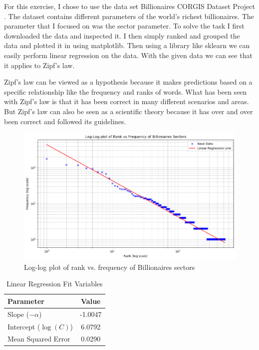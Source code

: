 \documentclass{article}
\begin{document}
For this exercise, I chose to use the data set Billionaires CORGIS Dataset Project \cite{corgiseduCORGISDatasets}. The dataset contains different parameters of the world's richest billionaires. The parameter that I focused on was the sector parameter. To solve the task I first downloaded the data and inspected it. I then simply ranked and grouped the data and plotted it in using matplotlib. Then using a library like sklearn we can easily perform linear regression on the data. With the given data we can see that it applies to Zipf's law.

Zipf's law can be viewed as a hypothesis because it makes predictions based on a specific relationship like the frequency and ranks of words. What has been seen with Zipf's law is that it has been correct in many different scenarios and areas. But Zipf's law can also be seen as a scientific theory because it has over and over been correct and followed its guidelines.

\begin{figure}[H]
    \centering
    \includegraphics[width=\textwidth]{Graph.png}
    \caption{Log-log plot of rank vs. frequency of Billionaires sectors}
    \label{fig:graph}
\end{figure}

\begin{table}[H]
\centering
\begin{tabular}{|l|c|}
\hline
\textbf{Parameter} & \textbf{Value} \\
\hline
Slope ($-\alpha$) & -1.0047 \\
Intercept ($\log(C)$) & 6.0792 \\
Mean Squared Error& 0.0290 \\
\hline
\end{tabular}
\caption{Linear Regression Fit Variables}
\label{table:linear_regression_details}
\end{table}



\end{document}
